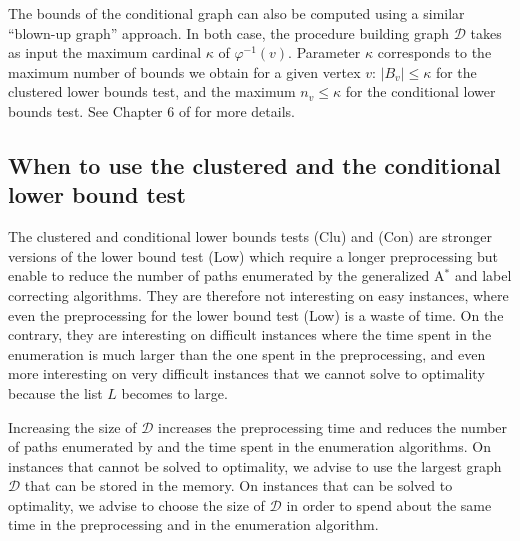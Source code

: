 \documentclass[11pt]{amsart}
\theoremstyle{plain}
\theoremstyle{remark}
\begin{document}
The bounds of the conditional graph can also be computed using a similar ``blown-up graph'' approach. In both case, the procedure building graph $\mathcal{D}$ takes as input the maximum cardinal $\kappa$ of $\varphi^{-1}(v)$. Parameter $\kappa$ corresponds to the maximum number of bounds we obtain for a given vertex $v$:  $|B_{v}| \leq \kappa$ for the clustered lower bounds test, and the maximum $n_{v}\leq \kappa$ for the conditional lower bounds test. See Chapter 6 of \cite{parmentier2016thesis} for more details.






























\subsection{When to use the clustered and the conditional lower bound test} \label{sub:choosing_between_the_clustered_and_the_conditional_lower_bound_test}


The clustered and conditional lower bounds tests (Clu) and (Con) are stronger versions of the lower bound test (Low) which require a longer preprocessing but enable to reduce the number of paths enumerated by the generalized A$^{*}$ and label correcting algorithms. They are therefore not interesting on easy instances, where even the preprocessing for the lower bound test (Low) is a waste of time. On the contrary, they are interesting on difficult instances where the time spent in the enumeration is much larger than the one spent in the preprocessing, and even more interesting on very difficult instances that we cannot solve to optimality because the list $L$ becomes to large. 

Increasing the size of $\mathcal{D}$ increases the preprocessing time and reduces the number of paths enumerated by and the time spent in the enumeration algorithms. On instances that cannot be solved to optimality, we advise to use the largest graph $\mathcal{D}$ that can be stored in the memory. On instances that can be solved to optimality, we advise to choose the size of $\mathcal{D}$ in order to spend about the same time in the preprocessing and in the enumeration algorithm.
\end{document}
